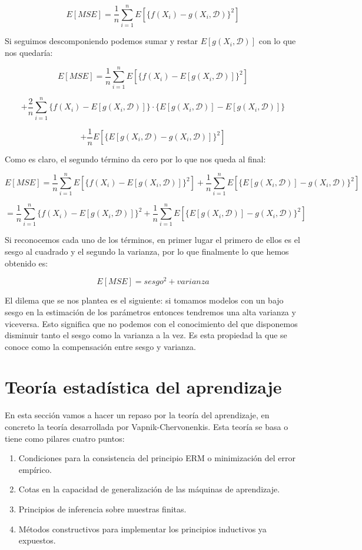 $$E[MSE] = \frac{1}{n}\sum_{i=1}^{n}E[\{ f(X_i) - g(X_i, \mathcal{D}) \}^2]$$

Si seguimos descomponiendo podemos sumar y restar $E[g(X_i, \mathcal{D})]$ con lo que nos quedaría:

$$E[MSE] = \frac{1}{n}\sum_{i=1}^{n}E[\{ f(X_i) - E[g(X_i, \mathcal{D})] \}^2]$$

$$ + \frac{2}{n}\sum_{i=1}^{n}\{ f(X_i) - E[g(X_i, \mathcal{D})] \}\cdot \{ E[g(X_i, \mathcal{D})] - E[g(X_i, \mathcal{D})] \}$$

$$ + \frac{1}{n}E[\{ E[g(X_i, \mathcal{D}) - g(X_i, \mathcal{D})] \}^2]$$

Como es claro, el segundo término da cero por lo que nos queda al final:

$$E[MSE] = \frac{1}{n} \sum_{i=1}^{n}E[\{ f(X_i) - E[g(X_i, \mathcal{D})] \}^2] + \frac{1}{n}\sum_{i=1}^{n}E[\{ E[g(X_i, \mathcal{D})] - g(X_i, \mathcal{D}) \}^2]$$

$$=\frac{1}{n}\sum_{i=1}^{n}\{ f(X_i) - E[g(X_i, \mathcal{D})] \}^2 + \frac{1}{n}\sum_{i=1}^{n}E[\{ E[g(X_i, \mathcal{D})] - g(X_i, \mathcal{D}) \}^2]$$

Si reconocemos cada uno de los términos, en primer lugar el primero de ellos es el sesgo al cuadrado y el segundo la varianza, por lo que finalmente lo que hemos obtenido es:

$$E[MSE] = sesgo^2 + varianza$$

El dilema que se nos plantea es el siguiente: si tomamos modelos con un bajo sesgo en la estimación de los parámetros entonces tendremos una alta varianza y viceversa. Esto significa que no podemos con el conocimiento del que disponemos disminuir tanto el sesgo como la varianza a la vez. Es esta propiedad la que se conoce como la compensación entre sesgo y varianza.

\section{Teoría estadística del aprendizaje}

En esta sección vamos a hacer un repaso por la teoría del aprendizaje, en concreto la teoría desarrollada por Vapnik-Chervonenkis. Esta teoría se basa o tiene como pilares cuatro puntos:

\begin{enumerate}
	\item Condiciones para la consistencia del principio ERM o minimización del error empírico.
	\item Cotas en la capacidad de generalización de las máquinas de aprendizaje.
	\item Principios de inferencia sobre muestras finitas.
	\item Métodos constructivos para implementar los principios inductivos ya expuestos.
\end{enumerate}

